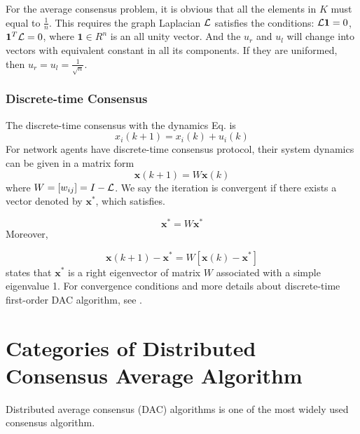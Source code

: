 For the average consensus problem, it is obvious that all the elements
in $K$ must equal to $\frac{1}{n}$. This requires the graph Laplacian
${\cal L}$ satisfies the conditions: ${\cal L}\mathbf{1}=0$, $\mathbf{1}^{T}{\cal L}=0$,
where $\mathbf{1}\in R^{n}$ is an all unity vector. And the $u_{r}$
and $u_{l}$ will change into vectors with equivalent constant in
all its components. If they are uniformed, then $u_{r}=u_{l}=\frac{1}{\sqrt{n}}.$ 


\subsubsection{Discrete-time Consensus}

The discrete-time consensus with the dynamics Eq.
is 
\begin{equation}
x_{i}\left(k+1\right)=x_{i}\left(k\right)+u_{i}\left(k\right)\label{eq:discre-time consensus-1}
\end{equation}
For network agents have discrete-time consensus protocol, their system
dynamics can be given in a matrix form
\begin{equation}
\mathbf{x}(k+1)=W\mathbf{x}(k)
\end{equation}
where $W=\left[w_{ij}\right]=I-{\cal L}$. We say the iteration is
convergent if there exists a vector denoted by $\mathbf{x}^{*}$,
which satisfies.

\begin{equation}
\mathbf{x}^{*}=W\mathbf{x}^{*}\label{eq:stable state iteration}
\end{equation}
Moreover, 

\begin{equation}
\mathbf{x}(k+1)-\mathbf{x}^{*}=W\left[\mathbf{x}(k)-\mathbf{x}^{*}\right]\label{eq:error vector iter. 1st}
\end{equation}
 states that $\mathbf{x}^{*}$
is a right eigenvector of matrix $W$ associated with a simple eigenvalue
1. For  convergence conditions and more details about discrete-time
first-order DAC algorithm, see . 


\section{Categories of Distributed Consensus Average Algorithm}

Distributed average consensus (DAC) algorithms is one of the most
widely used consensus algorithm.

